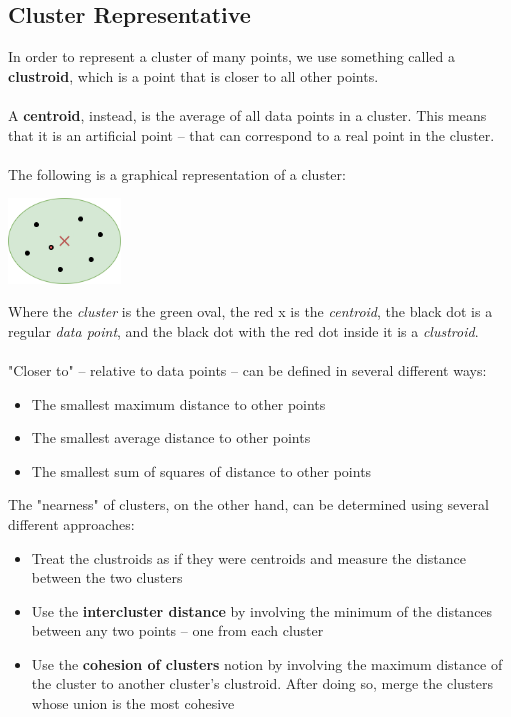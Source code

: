 \documentclass{article}
\begin{document}
\subsection{Cluster Representative}
In order to represent a cluster of many points, we use something called a \textbf{clustroid}, which is a point that is closer to all other points. \\ \\
A \textbf{centroid}, instead, is the average of all data points in a cluster. This means that it is an artificial point -- that can correspond to a real point in the cluster. \\ \\
The following is a graphical representation of a cluster:

\begin{center}
	\includegraphics[width=3cm]{./clustering.png}
\end{center}
Where the \textit{cluster} is the green oval, the red x is the \textit{centroid}, the black dot is a regular \textit{data point}, and the black dot with the red dot inside it is a \textit{clustroid}. \\ \\
"Closer to" -- relative to data points -- can be defined in several different ways:

\begin{itemize}
	\item The smallest maximum distance to other points
	\item The smallest average distance to other points
	\item The smallest sum of squares of distance to other points
\end{itemize}
The "nearness" of clusters, on the other hand, can be determined using several different approaches:

\begin{itemize}
	\item Treat the clustroids as if they were centroids and measure the distance between the two clusters
	\item Use the \textbf{intercluster distance} by involving the minimum of the distances between any two points -- one from each cluster
	\item Use the \textbf{cohesion of clusters} notion by involving the maximum distance of the cluster to another cluster's clustroid. After doing so, merge the clusters whose union is the most cohesive
\end{itemize}
\end{document}
